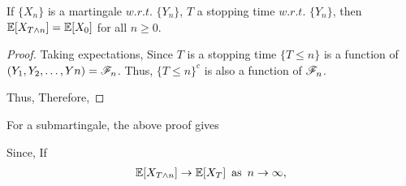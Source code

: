 \documentclass[all-lectures.tex]{subfiles}
\begin{document}
\begin{prop}
If $\{X_n\}$ is a martingale $w.r.t.$ $\{Y_n\}$, $T$ a stopping time $w.r.t.$ $\{Y_n\}$, then $\mathbb{E}[X_{T \wedge n}] = \mathbb{E}[X_0]$ for all $n\ge0$.
\end{prop}
\begin{proof}
Taking expectations,
Since $T$ is a stopping time $\{T \le n\}$ is a function of $(Y_1, Y_2, \dots, Yn) = \mathscr{F}_n$. Thus, $\{T \le n\}^c$ is also a function of $\mathscr{F}_n$.

Thus,
Therefore,
\end{proof}
For a submartingale, the above proof gives 

Since,
If 
\begin{align}
\label{eq1}	
\mathbb{E}[X_{T \wedge n}] \to \mathbb{E}[X_T] \enskip \text{as} \enskip n \to \infty,
\end{align}
\end{document}
